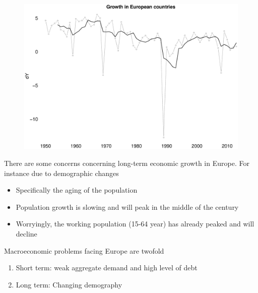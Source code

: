 \documentclass{beamer}
\begin{document}
\begin{frame}
  \begin{figure}
    \includegraphics[scale=.3]{growth_europe.eps}
  \end{figure}
\end{frame}

\begin{frame}
 There are some concerns concerning long-term economic growth in Europe.
 For instance due to demographic changes
 \begin{itemize}
   \item Specifically the aging of the population
   \item Population growth is slowing and will peak in the middle of the century
   \item Worryingly, the working population (15-64 year) has already peaked and will decline
 \end{itemize}
   \medskip
   Macroeconomic problems facing Europe are twofold
   \begin{enumerate}
     \item Short term: weak aggregate demand and high level of debt
     \item Long term: Changing demography 
   \end{enumerate}
\end{frame}
\end{document}
